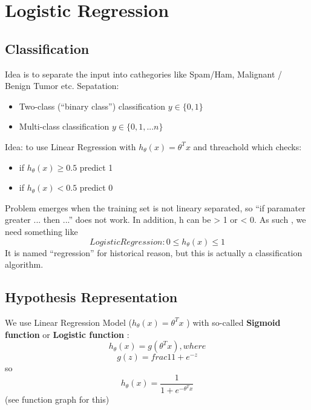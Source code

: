 \documentclass{scrartcl}
\begin{document}
\label {Chapter 6}
\section {Logistic Regression}
\subsection{Classification}
Idea is to separate the input into cathegories like Spam/Ham,
Malignant / Benign Tumor etc. Sepatation: \begin{itemize}
\item {Two-class} (``binary class'') classification $y \in \{0, 1\}$
\item {Multi-class} classification $y \in \{0, 1, ... n\}$
\end{itemize}
Idea: to use Linear Regression with $h_\theta(x) = \theta^T x$ and
threachold which checks: \begin{itemize}
\item{if $h_\theta(x) \geq 0.5$} predict 1
\item{if $h_\theta(x) < 0.5$} predict 0
\end{itemize}
Problem emerges when the training set is not lineary separated, so
``if paramater greater ... then ...'' does not work. In addition, h
can be > 1 or < 0. As such , we need something like \[ Logistic
Regression: 0 \leq h_\theta(x) \leq 1
\]
It is named ``regression'' for historical reason, but this is actually
a classification algorithm.

\subsection{Hypothesis Representation}
We use Linear Regression Model ($h_\theta(x) = \theta^Tx$ ) with
so-called {\bf Sigmoid function} or {\bf Logistic function} : \[
h_\theta(x) = g(\theta^Tx), where \]
\[g(z) = frac{1}{1 + e^{-z}}\] so
\begin{equation*}
  h_\theta(x) = \frac{1}{1 + e^{-\theta^Tx}}
\end{equation*}
(see function graph for this)
\end{document}
